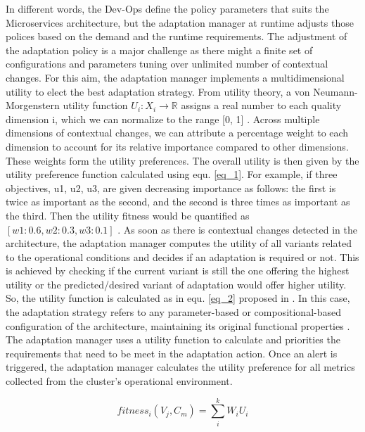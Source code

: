 \documentclass[sigconf]{acmart}
\begin{document}
In different words, the Dev-Ops define the policy parameters that suits the Microservices architecture, but the adaptation manager at runtime adjusts those polices based on the demand and the runtime requirements. The adjustment of the adaptation policy is a major challenge as there might a finite set of configurations and parameters tuning over unlimited number of contextual changes. For this aim, the adaptation manager implements a multidimensional utility to elect the best adaptation strategy. From utility theory, a von Neumann-Morgenstern utility function $U_{i} : X_{i} \rightarrow \mathbb{R}$ 
assigns a real number to each quality dimension i, which we can normalize to the range [0, 1] \cite{fishburn1979two}. Across multiple dimensions of contextual changes, we can attribute a percentage weight to each dimension to account for its relative importance compared to other dimensions. These weights form the utility preferences. The overall utility is then given by the utility preference function calculated using equ. \ref{eq_1}. For example, if three objectives, u1, u2, u3, are given decreasing importance as follows: the first is twice as important as the second, and the second is three times as important as the third. Then the utility fitness would be quantified as $[w1 : 0.6, w2 : 0.3, w3 : 0.1]$ \cite{Cheng:2009p3902}. As soon as there is contextual changes detected in the architecture, the adaptation manager computes the utility of all variants related to the operational conditions and decides if an adaptation is required or not. This is achieved by checking if the current variant is still the one offering the highest utility or the predicted/desired variant of adaptation would offer higher utility. So, the utility function is calculated as in equ. \ref{eq_2} proposed in \cite{KonstantinosKakousis:2008ub}. In this case, the adaptation strategy refers to any parameter-based or compositional-based configuration of the architecture, maintaining its original functional properties \cite{KonstantinosKakousis:2008ub}. The adaptation manager uses a utility function to calculate and priorities the requirements that need to be meet in the adaptation action. Once an alert is triggered, the adaptation manager calculates the utility preference for all metrics collected from the cluster's operational environment. 

\begin{equation}
\label{eq_1}
fitness_{i}(V_{j},C_{m}) = \sum_{i}^{k} W_{i} U_{i}
\end{equation}
\end{document}
